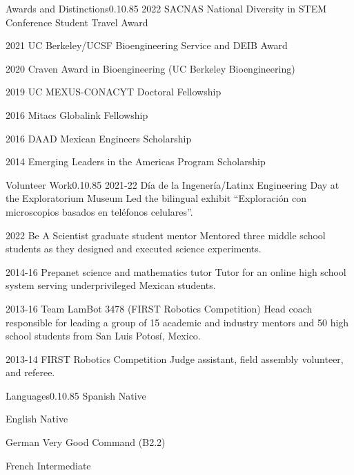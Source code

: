 \documentclass{federico_cv}
\begin{document}
\begin{tblSection}{Awards and Distinctions}{0.1}{0.85}
\award
{2022}
{SACNAS National Diversity in STEM Conference Student Travel Award}

\award
{2021}
{UC Berkeley/UCSF Bioengineering Service and DEIB Award}

\award
{2020}
{Craven Award in Bioengineering (UC Berkeley Bioengineering)}

\award
{2019}
{UC MEXUS-CONACYT Doctoral Fellowship}

\award
{2016}
{Mitacs Globalink Fellowship}

\award
{2016}
{DAAD Mexican Engineers Scholarship}

\award
{2014}
{Emerging Leaders in the Americas Program Scholarship}

\end{tblSection}


\begin{tblSection}{Volunteer Work}{0.1}{0.85}
\job
{2021-22}
{Día de la Ingenería/Latinx Engineering Day at the Exploratorium Museum}
{Led the bilingual exhibit ``Exploración con microscopios basados en teléfonos celulares''.}

\leftbfrightsinglenobreak
{2022}
{Be A Scientist graduate student mentor}
{Mentored three middle school students as they designed and executed science experiments.}

\job
{2014-16}
{Prepanet science and mathematics tutor}
{Tutor for an online high school system serving underprivileged Mexican students.}

\job
{2013-16}
{Team LamBot 3478 (FIRST Robotics Competition)}
{Head coach responsible for leading a group of 15 academic and industry mentors and 50 high school students from San Luis Potosí, Mexico.}

\job
{2013-14}
{FIRST Robotics Competition}
{Judge assistant, field assembly volunteer, and referee.}

\end{tblSection}

\begin{tblSection}{Languages}{0.1}{0.85}
\leftrightsingletight
{Spanish}
{Native}

\leftrightsingletight
{English}
{Native}

\leftrightsingletight
{German}
{Very Good Command (B2.2)}

\leftrightsingletight
{French}
{Intermediate}
\end{tblSection}
\end{document}
